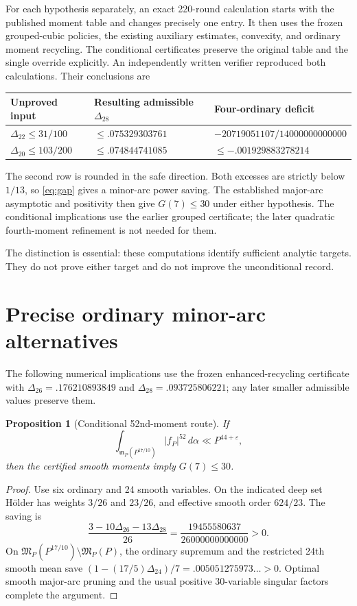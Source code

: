 \documentclass[11pt,letterpaper]{article}
\newtheorem{proposition}{Proposition}[section]
\theoremstyle{remark}
\newcommand{\M}{\mathfrak M}
\newcommand{\m}{\mathfrak m}
\newcommand{\eps}{\varepsilon}
\newcommand{\dd}{\,d\alpha}
\begin{document}
For each hypothesis separately, an exact 220-round calculation starts with the
published moment table and changes precisely one entry. It then uses the frozen
grouped-cubic policies, the existing auxiliary estimates, convexity, and ordinary
moment recycling. The conditional certificates preserve the original table and
the single override explicitly. An independently written verifier reproduced
both calculations. Their conclusions are
\begin{center}
\begin{tabular}{lll}
\toprule
Unproved input & Resulting admissible $\Delta_{28}$ & Four-ordinary deficit\\
\midrule
$\Delta_{22}\le31/100$ & $\le.075329303761$ &
 $-20719051107/14000000000000$\\
$\Delta_{20}\le103/200$ & $\le.074844741085$ &
 $\le-.001929883278214$\\
\bottomrule
\end{tabular}
\end{center}
The second row is rounded in the safe direction. Both excesses are strictly below
$1/13$, so \eqref{eq:gap} gives a minor-arc power saving. The established major-arc
asymptotic and positivity then give $G(7)\le30$ under either hypothesis. The
conditional implications use the earlier grouped certificate; the later quadratic
fourth-moment refinement is not needed for them.

The distinction is essential: these computations identify sufficient analytic
targets. They do not prove either target and do not improve the unconditional
record.

\section{Precise ordinary minor-arc alternatives}\label{sec:ordinary}

The following numerical implications use the frozen enhanced-recycling certificate
with $\Delta_{26}=.176210893849$ and $\Delta_{28}=.093725806221$; any later smaller
admissible values preserve them.

\begin{proposition}[Conditional 52nd-moment route]
If
\[
 \int_{\m_P(P^{17/10})}|f_P|^{52}\dd\ll P^{44+\eps},
\]
then the certified smooth moments imply $G(7)\le30$.
\end{proposition}
\begin{proof}
Use six ordinary and 24 smooth variables. On the indicated deep set H\"older has
weights $3/26$ and $23/26$, and effective smooth order $624/23$.
The saving is
\[
 \frac{3-10\Delta_{26}-13\Delta_{28}}{26}
       =\frac{19455580637}{26000000000000}>0.
\]
On $\M_P(P^{17/10})\setminus\M_P(P)$, the ordinary supremum and the restricted
24th smooth mean save $(1-(17/5)\Delta_{24})/7=.005051275973\ldots>0$.
Optimal smooth major-arc pruning and the usual positive 30-variable singular factors
complete the argument.
\end{proof}
\end{document}
